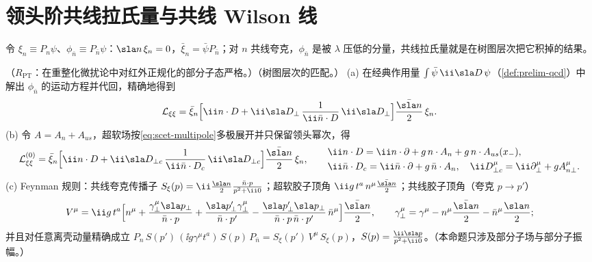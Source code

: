 \section{领头阶共线拉氏量与共线 Wilson 线}\label{sec:scet-lagrangian}

令 $\xi_n\equiv P_n\psi$、$\phi_{\bar n}\equiv P_{\bar n}\psi$：$\sla n\,\xi_n=0$，$\bar\xi_n=\bar\psi P_{\bar n}$；对 $n$ 共线夸克，$\phi_{\bar n}$ 是被 $\lambda$ 压低的分量，共线拉氏量就是在树图层次把它积掉的结果。

\begin{proposition}\label{prop:scet-lagrangian}
（$R_{\mathrm{PT}}$：在重整化微扰论中对红外正规化的部分子态严格。）（树图层次的匹配。）
(a) 在经典作用量 $\int\bar\psi\,\ii\sla D\,\psi$（\cref{def:prelim-qcd}）中解出 $\phi_{\bar n}$ 的运动方程并代回，精确地得到
\begin{equation}\label{eq:scet-Lxixi-exact}
\mathcal L_{\xi\xi}=\bar\xi_n\Big[\ii n\cdot D+\ii\sla D_\perp\,\frac{1}{\ii\bar n\cdot D}\,\ii\sla D_\perp\Big]\frac{\bar{\sla n}}{2}\,\xi_n .
\end{equation}
(b) 令 $A=A_n+A_{us}$，超软场按\cref{eq:scet-multipole}多极展开并只保留领头幂次，得
\begin{equation}\label{eq:scet-L0xi}
\mathcal L^{(0)}_{\xi\xi}=\bar\xi_n\Big[\ii n\cdot D+\ii\sla D_{\perp c}\,\frac{1}{\ii\bar n\cdot D_c}\,\ii\sla D_{\perp c}\Big]\frac{\bar{\sla n}}{2}\,\xi_n,\qquad
\begin{aligned}
&\ii n\cdot D=\ii n\cdot\partial+g\,n\cdot A_n+g\,n\cdot A_{us}(x_-),\\
&\ii\bar n\cdot D_c=\ii\bar n\cdot\partial+g\,\bar n\cdot A_n,\quad \ii D^\mu_{\perp c}=\ii\partial^\mu_\perp+gA^\mu_{n\perp}.
\end{aligned}
\end{equation}
(c) Feynman 规则：共线夸克传播子 $S_\xi(p)=\ii\frac{\sla n}{2}\frac{\bar n\cdot p}{p^2+\ii0}$；超软胶子顶角 $\ii g\,t^a\,n^\mu\frac{\bar{\sla n}}{2}$；共线胶子顶角（夸克 $p\to p'$）
\begin{equation}\label{eq:scet-collvertex}
V^\mu=\ii g\,t^a\Big[n^\mu+\frac{\gamma_\perp^\mu\sla p_\perp}{\bar n\cdot p}+\frac{\sla p'_\perp\gamma_\perp^\mu}{\bar n\cdot p'}-\frac{\sla p'_\perp\sla p_\perp}{\bar n\cdot p\,\bar n\cdot p'}\,\bar n^\mu\Big]\frac{\bar{\sla n}}{2},\qquad
\gamma_\perp^\mu=\gamma^\mu-n^\mu\frac{\bar{\sla n}}{2}-\bar n^\mu\frac{\sla n}{2};
\end{equation}
并且对任意离壳动量精确成立 $P_n\,S(p')\,(\ii g\gamma^\mu t^a)\,S(p)\,P_{\bar n}=S_\xi(p')\,V^\mu\,S_\xi(p)$，$S(p)=\frac{\ii\sla p}{p^2+\ii0}$。（本命题只涉及部分子场与部分子振幅。）
\end{proposition}

